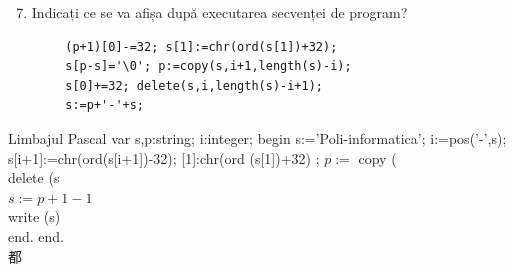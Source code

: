 \documentclass[10pt]{article}
\begin{document}
\begin{enumerate}
  \setcounter{enumi}{6}
  \item Indicați ce se va afișa după executarea secvenței de program?
\end{enumerate}

\begin{verbatim}
        (p+1)[0]-=32; s[1]:=chr(ord(s[1])+32);
        s[p-s]='\0'; p:=copy(s,i+1,length(s)-i);
        s[0]+=32; delete(s,i,length(s)-i+1);
        s:=p+'-'+s;
\end{verbatim}

Limbajul Pascal var s,p:string; i:integer; begin s:='Poli-informatica'; i:=pos('-',s); s[i+1]:=chr(ord(s[i+1])-32); [1]:chr(ord (s[1])+32) ; $p:=$ copy (\\
delete (s\\
$s:=p+1-1$\\
write (s)\\
end. end.\\
都\\
\end{document}
